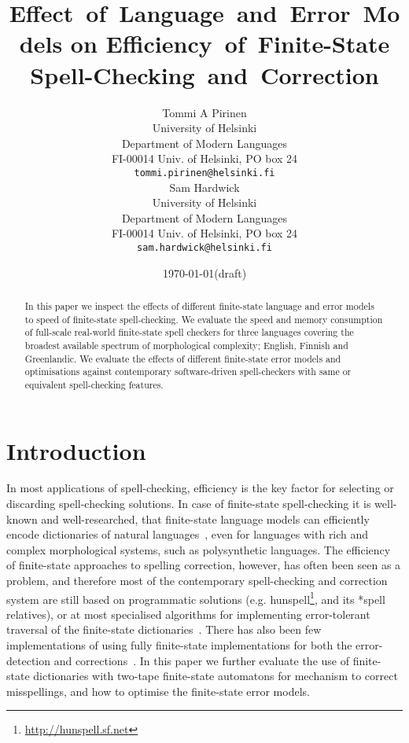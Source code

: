 \documentclass[11pt]{article}
\title{Effect~of~Language~and~Error~Models on Efficiency~of~Finite-State
Spell-Checking~and~Correction}
\author{
Tommi A Pirinen\\
University of Helsinki\\
Department of Modern Languages\\
FI-00014 Univ. of Helsinki, PO box 24\\
{\tt tommi.pirinen@helsinki.fi} \\\And
Sam Hardwick\\
University of Helsinki\\
Department of Modern Languages\\
FI-00014 Univ. of Helsinki, PO box 24\\
{\tt sam.hardwick@helsinki.fi} \\
}
\date{\today (draft)}
\begin{document}
\maketitle
\begin{abstract}
In this paper we inspect the effects of different finite-state language and
error models to speed of finite-state spell-checking. We evaluate the speed and
memory consumption of full-scale real-world finite-state spell checkers for
three languages covering the broadest available spectrum of morphological
complexity; English, Finnish and Greenlandic. We evaluate the effects of
different finite-state error models and optimisations against contemporary
software-driven spell-checkers with same or equivalent spell-checking features.
\end{abstract}

\section{Introduction}
\label{sec:introduction}

In most applications of spell-checking, efficiency is the key factor for
selecting or discarding spell-checking solutions. In case of finite-state
spell-checking it is well-known and well-researched, that finite-state language
models can efficiently encode dictionaries of natural
languages~\cite{beesley/2003}, even for languages with rich and complex
morphological systems, such as polysynthetic languages. The efficiency of
finite-state approaches to spelling correction, however, has often been seen as
a problem, and therefore most of the contemporary spell-checking and correction
system are still based on programmatic solutions (e.g.
hunspell\footnote{\url{http://hunspell.sf.net}}, and its *spell relatives), or
at most specialised algorithms for implementing error-tolerant traversal of the
finite-state dictionaries~\cite{oflazer/1996,hulden/2009}. There has also been
few implementations of using fully finite-state implementations for both the
error-detection and corrections~\cite{schulz/2002,pirinen/2010/lrec}. In this
paper we further evaluate the use of finite-state dictionaries with two-tape
finite-state automatons for mechanism to correct misspellings, and how to
optimise the finite-state error models.
\end{document}
